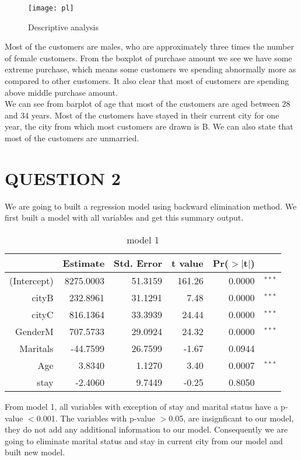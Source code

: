 \documentclass[12pt,a4paper]{article}
\begin{document}
\begin{figure}[H]
\texttt{[image: pl]}
\centering
\caption{Descriptive analysis}
\end{figure}
Most of the customers are males, who are approximately three times the number of female customers.
From the boxplot of purchase amount we see we have some extreme purchase, which means some customers we spending abnormally more as compared to other customers. It also clear that most of customers are spending above middle purchase amount.\\
We can see from barplot of age that most of the customers are  aged between 28 and 34 years. Most of the customers have stayed in their current city for one year, the city from which most customers are drawn is B. We can also state that most of the customers are unmarried.
\section{QUESTION 2}
We are going to built a regression model using backward elimination method. We first built a model with all variables and get this summary output.
\begin{table}[H]
\centering
\begin{tabular}{rrrrrr}
  \hline
 & Estimate & Std. Error & t value & Pr($>$$|$t$|$) \\ 
  \hline
(Intercept) & 8275.0003 & 51.3159 & 161.26 & 0.0000& $^{***}$  \\ 
  cityB & 232.8961 & 31.1291 & 7.48 & 0.0000& $^{***}$ \\ 
  cityC & 816.1364 & 33.3939 & 24.44 & 0.0000 & $^{***}$  \\ 
  GenderM & 707.5733 & 29.0924 & 24.32 & 0.0000& $^{***}$  \\ 
  Maritals & -44.7599 & 26.7599 & -1.67 & 0.0944 \\ 
  Age & 3.8340 & 1.1270 & 3.40 & 0.0007& $^{***}$  \\ 
  stay & -2.4060 & 9.7449 & -0.25 & 0.8050 \\ 
   \hline
\end{tabular}
\caption{model 1}
\end{table}
From model 1, all variables with exception of stay and marital status have a p-value $<$0.001. The variables with p-value $>$0.05, are insignficant to our model, they do not add any additional information to our model. Consequently we are going to eliminate marital status and stay in current city from our model and built new model.
\end{document}
